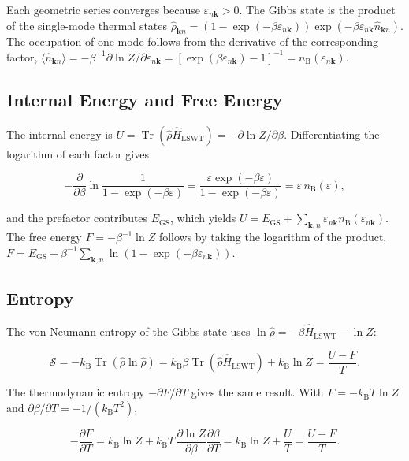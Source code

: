 Each geometric series converges because \(\varepsilon_{n\mathbf k}>0\). The Gibbs state is the product of the single-mode thermal states \(\hat\rho_{\mathbf kn}=(1-\exp(-\beta\varepsilon_{n\mathbf k}))\exp(-\beta\varepsilon_{n\mathbf k}\hat n_{\mathbf kn})\). The occupation of one mode follows from the derivative of the corresponding factor, \(\langle\hat n_{\mathbf kn}\rangle=-\beta^{-1}\partial\ln Z/\partial\varepsilon_{n\mathbf k}=[\exp(\beta\varepsilon_{n\mathbf k})-1]^{-1}=n_{\mathrm B}(\varepsilon_{n\mathbf k})\).

\subsection{Internal Energy and Free Energy}

The internal energy is \(U=\operatorname{Tr}(\hat\rho\hat H_{\mathrm{LSWT}})=-\partial\ln Z/\partial\beta\). Differentiating the logarithm of each factor gives

\[
-\frac{\partial}{\partial\beta}\ln\frac{1}{1-\exp(-\beta\varepsilon)}
=\frac{\varepsilon\exp(-\beta\varepsilon)}{1-\exp(-\beta\varepsilon)}
=\varepsilon\,n_{\mathrm B}(\varepsilon),
\]

and the prefactor contributes \(E_{\mathrm{GS}}\), which yields \(U=E_{\mathrm{GS}}+\sum_{\mathbf k,n}\varepsilon_{n\mathbf k}n_{\mathrm B}(\varepsilon_{n\mathbf k})\). The free energy \(F=-\beta^{-1}\ln Z\) follows by taking the logarithm of the product, \(F=E_{\mathrm{GS}}+\beta^{-1}\sum_{\mathbf k,n}\ln(1-\exp(-\beta\varepsilon_{n\mathbf k}))\).

\subsection{Entropy}

The von Neumann entropy of the Gibbs state uses \(\ln\hat\rho=-\beta\hat H_{\mathrm{LSWT}}-\ln Z\):

\[
\mathcal S=-k_{\mathrm B}\operatorname{Tr}(\hat\rho\ln\hat\rho)
=k_{\mathrm B}\beta\operatorname{Tr}(\hat\rho\hat H_{\mathrm{LSWT}})+k_{\mathrm B}\ln Z
=\frac{U-F}{T}.
\]

The thermodynamic entropy \(-\partial F/\partial T\) gives the same result. With \(F=-k_{\mathrm B}T\ln Z\) and \(\partial\beta/\partial T=-1/(k_{\mathrm B}T^2)\),

\[
-\frac{\partial F}{\partial T}
=k_{\mathrm B}\ln Z+k_{\mathrm B}T\,\frac{\partial\ln Z}{\partial\beta}\frac{\partial\beta}{\partial T}
=k_{\mathrm B}\ln Z+\frac{U}{T}
=\frac{U-F}{T}.
\]

